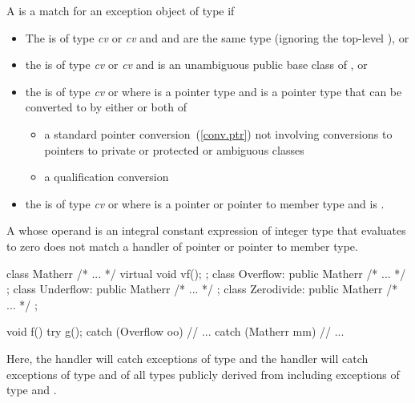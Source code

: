 \pnum
{}%
A
is a match for
an exception object
of type
if
\begin{itemize}
\item%
The
is of type
\textit{cv}
or
\textit{cv}
and
and
are the same type (ignoring the top-level
),
or
\item%
the
is of type
\textit{cv}
or
\textit{cv}
and
is an unambiguous public base class of
,
or
\item%
the
is of type
\textit{cv}
 or  where  is a pointer type
and
is a pointer type that can be
converted to 
by either or both of
\begin{itemize}

\item%
a standard pointer conversion~(\ref{conv.ptr}) not involving conversions
to pointers to private or protected or ambiguous classes
\item%
a qualification conversion

\end{itemize}

\item
the  is of type \textit{cv}  or  where  is a pointer or pointer to member type and  is .

\end{itemize}

\enternote
A
whose operand is an integral constant expression of integer type
that evaluates to zero does not match a handler of pointer or pointer to member type.
\exitnote

\enterexample
\begin{codeblock}
class Matherr { /* ... */ virtual void vf(); };
class Overflow: public Matherr { /* ... */ };
class Underflow: public Matherr { /* ... */ };
class Zerodivide: public Matherr { /* ... */ };

void f() {
  try {
    g();
  } catch (Overflow oo) {
        // ...
  } catch (Matherr mm) {
        // ...
  }
}
\end{codeblock}
Here, the
handler will catch exceptions of type
and the
handler will catch exceptions of type
and of all types publicly derived from
including exceptions of type
and
.
\exitexample

